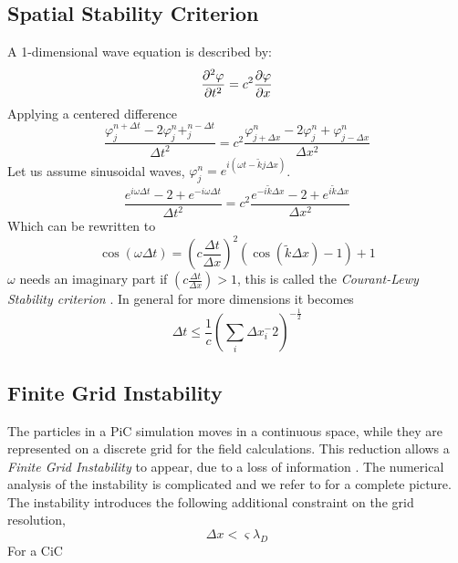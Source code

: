     \subsection{Spatial Stability Criterion}
        A 1-dimensional wave equation is described by:
        \begin{equation}
                \pdv[2]{\varphi}{t} = c^2 \pdv{\varphi}{x}
        \end{equation}
        Applying a centered difference
        \begin{equation}
            \frac{\varphi^{n + \Delta t}_{j} - 2 \varphi^{n}_{j} + ^{n - \Delta t}_{j}}{\Delta t^2}
            =
            c^2\frac{\varphi^n_{j+\Delta x} - 2\varphi^n_{j} + \varphi^n_{j-\Delta x}}{\Delta x^2}
        \end{equation}
        Let us assume sinusoidal waves, \(\varphi^n_j = e^{i(\omega t  - \tilde{k}j\Delta x)}\).
        \begin{equation}
            \frac{e^{i\omega \Delta t} - 2 +e^{-i\omega \Delta t} }{\Delta t^2}
            = c^2 \frac{e^{-i\tilde k \Delta x} - 2 + e^{i\tilde k \Delta x}}{\Delta x ^2}
        \end{equation}
        Which can be rewritten to
        \begin{equation}
            \cos(\omega \Delta t) = \left(c\frac{\Delta t}{\Delta x}\right)^2\left(\cos(\tilde k \Delta x) - 1 \right) + 1
        \end{equation}
        \(\omega\) needs an imaginary part if \( \left(c\frac{\Delta t}{\Delta x}\right)>1\), this is called the \textit{Courant-Lewy Stability criterion}
        \citep{courant_uber_1869}. In general for more dimensions it becomes
        \begin{equation}
            \Delta t \leq \frac{1}{c} \left(\sum_i\Delta x_i^-2\right)^{-\frac{1}{2}}
        \end{equation}

    \subsection{Finite Grid Instability}
        \label{sec:finite_grid_instability}
        The particles in a PiC simulation moves in a continuous space, while they are
        represented on a discrete grid for the field calculations. This reduction allows
        a \textit{Finite Grid Instability} to appear, due to a loss of information \citep{lapenta_particle_????}.
        The numerical analysis of the instability is complicated and we refer to
        \citet{birdsall_plasma_2004,hockney_computer_1988} for a complete picture.
        The instability introduces the following additional constraint on the grid resolution,
        \begin{equation}
            \Delta x < \varsigma \lambda_D
        \end{equation}
        For a CiC
